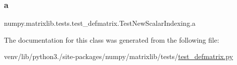 \subsubsection{\texorpdfstring{a}{a}}
{\footnotesize\ttfamily numpy.\+matrixlib.\+tests.\+test\+\_\+defmatrix.\+Test\+New\+Scalar\+Indexing.\+a\hspace{0.3cm}{\ttfamily [static]}}



The documentation for this class was generated from the following file\+:\begin{DoxyCompactItemize}
\item 
venv/lib/python3./site-\/packages/numpy/matrixlib/tests/\hyperlink{test__defmatrix_8py}{test\+\_\+defmatrix.\+py}\end{DoxyCompactItemize}
